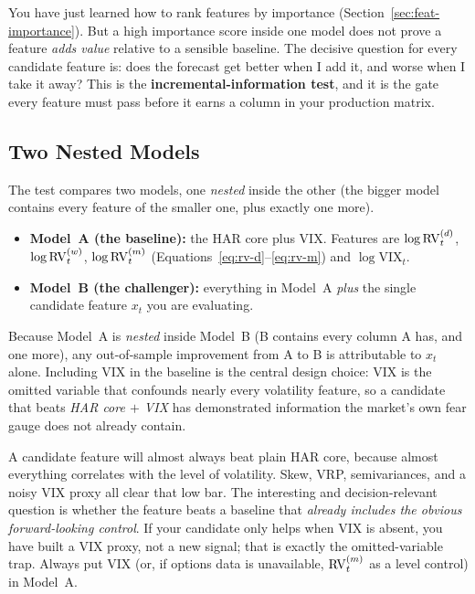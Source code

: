 You have just learned how to rank features by importance (Section~\ref{sec:feat-importance}). But a high importance score inside one model does not prove a feature \emph{adds value} relative to a sensible baseline. The decisive question for every candidate feature is: does the forecast get better when I add it, and worse when I take it away? This is the \textbf{incremental-information test}, and it is the gate every feature must pass before it earns a column in your production matrix.

\subsection{Two Nested Models}\label{sec:feat-incremental-nested}

The test compares two models, one \emph{nested} inside the other (the bigger model contains every feature of the smaller one, plus exactly one more).

\begin{itemize}[nosep]
  \item \textbf{Model~A (the baseline):} the HAR core plus VIX. Features are $\log \operatorname{RV}_t^{(d)}$, $\log \operatorname{RV}_t^{(w)}$, $\log \operatorname{RV}_t^{(m)}$ (Equations~\ref{eq:rv-d}--\ref{eq:rv-m}) and $\log \text{VIX}_t$.
  \item \textbf{Model~B (the challenger):} everything in Model~A \emph{plus} the single candidate feature $x_t$ you are evaluating.
\end{itemize}

Because Model~A is \emph{nested} inside Model~B (B contains every column A has, and one more), any out-of-sample improvement from A to B is attributable to $x_t$ alone. Including VIX in the baseline is the central design choice: VIX is the omitted variable that confounds nearly every volatility feature, so a candidate that beats \emph{HAR core $+$ VIX} has demonstrated information the market's own fear gauge does not already contain.

\begin{warning}
A candidate feature will almost always beat plain HAR core, because almost everything correlates with the level of volatility. Skew, VRP, semivariances, and a noisy VIX proxy all clear that low bar. The interesting and decision-relevant question is whether the feature beats a baseline that \emph{already includes the obvious forward-looking control}. If your candidate only helps when VIX is absent, you have built a VIX proxy, not a new signal; that is exactly the omitted-variable trap. Always put VIX (or, if options data is unavailable, $\operatorname{RV}_t^{(m)}$ as a level control) in Model~A.
\end{warning}

